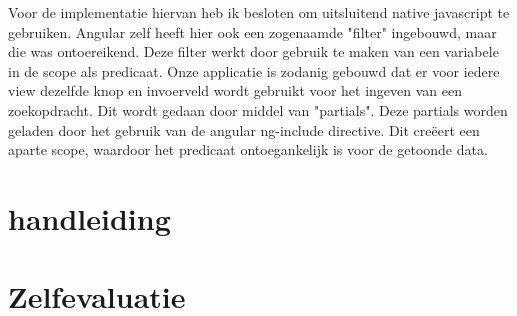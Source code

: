 \documentclass[a4paper,11pt]{article}
\begin{document}
Voor de implementatie hiervan heb ik besloten om uitsluitend native javascript te gebruiken. Angular zelf heeft hier ook een zogenaamde "filter" ingebouwd, maar die was ontoereikend. Deze filter werkt door gebruik te maken van een variabele in de scope als predicaat. Onze applicatie is zodanig gebouwd dat er voor iedere view dezelfde knop en invoerveld wordt gebruikt voor het ingeven van een zoekopdracht. Dit wordt gedaan door middel van "partials". Deze partials worden geladen door het gebruik van de angular ng-include directive. Dit creëert een aparte scope, waardoor het predicaat ontoegankelijk is voor de getoonde data.


\section{handleiding}

\section{Zelfevaluatie}
\end{document}
